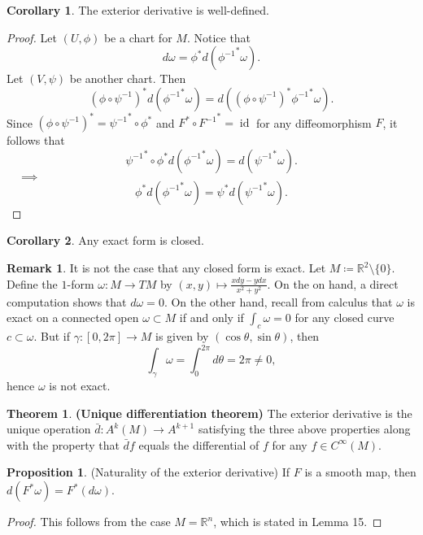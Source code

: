 \documentclass[10pt,letterpaper,cm]{nupset}
\theoremstyle{definition}
\newtheorem{remark}{Remark}
\newtheorem{theorem}{Theorem}
\newtheorem{corollary}{Corollary}
\newtheorem{prop}{Proposition}
\newcommand{\R}{\mathbb R}
\newcommand{\1}{\mathbf{1}}
\newcommand{\0}{\vec 0}
\DeclareMathOperator{\id}{id}
\begin{document}
\begin{corollary}
The exterior derivative is well-defined.
\end{corollary}
\begin{proof}
Let $(U, \phi)$ be a chart for $M$. Notice that $$d\omega = \phi^{\ast} d({\phi^{-1}}^{\ast}\omega).$$ Let $(V, \psi)$ be another chart. Then $$ (\phi \circ \psi^{-1})^{\ast} d({\phi^{-1}}^{\ast} \omega) =  d( (\phi \circ \psi^{-1})^{\ast}{\phi^{-1}}^{\ast} \omega).$$ Since $(\phi \circ \psi^{-1})^{\ast} = {\psi^{-1}}^{\ast} \circ \phi^{\ast}$ and $F^{\ast} \circ {F^{-1}}^{\ast}= \id$ for any diffeomorphism $F$, 
it follows that $${\psi^{-1}}^{\ast} \circ \phi^{\ast}d({\phi^{-1}}^{\ast} \omega) = d({\psi^{-1}}^{\ast} \omega).$$ $\quad \implies$  $$\phi^{\ast}d({\phi^{-1}}^{\ast} \omega) = \psi^{\ast} d({\psi^{-1}}^{\ast} \omega).$$
\end{proof}

\begin{corollary}
Any exact form is closed.
\end{corollary}

\begin{remark}
It is not the case that any closed form is exact. Let $M\coloneqq  \R^2 \setminus \{0\}$. Define the $1$-form $\omega : M \to TM$ by $(x, y) \mapsto \frac{xdy - y dx}{x^2 + y^2}$. On the on hand, a direct computation shows that $d \omega =0$. On the other hand, recall from calculus that $\omega$ is exact on a connected open $\omega \subset M$ if and only if $\int_c \omega =0$ for any closed curve $c \subset \omega$. But if $\gamma : [0, 2\pi] \to M$ is given by $(\cos \theta, \sin \theta)$, then  $$ \int_{\gamma} \omega = \int_{0}^{2\pi} d\theta = 2\pi \ne 0 ,$$ hence $\omega$ is not exact.
\end{remark}

\begin{theorem}{\textbf{(Unique differentiation theorem)}}
The exterior derivative is the unique operation $\bar{d} : A^k(M) \to A^{k+1}$ satisfying the three above properties along with the property that $\bar{d} f $ equals the differential of $f$ for any $f \in C^{\infty}(M)$.
\end{theorem}

\begin{prop} {(Naturality of the exterior derivative)}
If $F$ is a smooth map, then $d(F^{\ast} \omega) = F^{\ast}(d \omega).$
\end{prop}
\begin{proof}
This follows from the case $M = \R^n$, which is stated in Lemma 15.
\end{proof}
\end{document}
